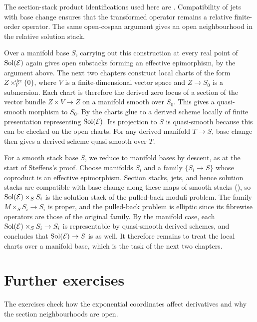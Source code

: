 The section-stack product identifications used here are
\cite[Lemma~3.2.21]{Steffens_Representability_Elliptic_Moduli}.
Compatibility of jets with base change ensures that the transformed
operator remains a relative finite-order operator.
The same open-cospan argument gives an open neighbourhood in the
relative solution stack.

Over a manifold base $S$, carrying out this construction at every real
point of $\operatorname{Sol}(\mathcal E)$ again gives open substacks forming an
effective epimorphism, by the argument above. The next two chapters
construct local charts of the form $Z\times_V^{\mathrm{der}}\{0\}$,
where $V$ is a finite-dimensional vector space and $Z\to S_0$ is a
submersion. Each chart is therefore the derived zero locus of a
section of the vector bundle $Z\times V\to Z$ on a manifold smooth
over $S_0$. This gives a quasi-smooth morphism to $S_0$.
By  the charts glue to a derived
scheme locally of finite presentation representing $\operatorname{Sol}(\mathcal E)$.
Its projection to $S$ is quasi-smooth because this can be checked on
the open charts. For any derived manifold $T\to S$, base change then
gives a derived scheme quasi-smooth over $T$.

For a smooth stack base $S$, we reduce to manifold bases by descent, as
at the start of Steffens's proof. Choose manifolds $S_i$ and a family
$\{S_i\to S\}$ whose coproduct is an effective epimorphism. Section
stacks, jets, and hence solution stacks are compatible with base change
along these maps of smooth stacks
(), so
$\operatorname{Sol}(\mathcal E)\times_SS_i$ is the solution stack of the pulled-back
moduli problem. The family $M\times_SS_i\to S_i$ is proper, and the
pulled-back problem is elliptic since its fibrewise operators are those
of the original family. By the manifold case, each
$\operatorname{Sol}(\mathcal E)\times_SS_i\to S_i$ is representable by quasi-smooth
derived schemes, and
 concludes that
$\operatorname{Sol}(\mathcal E)\to S$ is as well. It therefore remains to treat the
local charts over a manifold base, which is the task of the next two
chapters.

\section{Further exercises}

The exercises check how the exponential coordinates affect derivatives
and why the section neighbourhoods are open.

